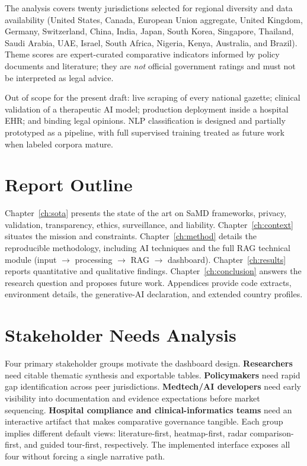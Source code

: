 The analysis covers twenty jurisdictions selected for regional diversity and data availability (United States, Canada, European Union aggregate, United Kingdom, Germany, Switzerland, China, India, Japan, South Korea, Singapore, Thailand, Saudi Arabia, UAE, Israel, South Africa, Nigeria, Kenya, Australia, and Brazil). Theme scores are expert-curated comparative indicators informed by policy documents and literature; they are \emph{not} official government ratings and must not be interpreted as legal advice.

Out of scope for the present draft: live scraping of every national gazette; clinical validation of a therapeutic AI model; production deployment inside a hospital EHR; and binding legal opinions. NLP classification is designed and partially prototyped as a pipeline, with full supervised training treated as future work when labeled corpora mature.

\section{Report Outline}
\label{sec:outline}

Chapter~\ref{ch:sota} presents the state of the art on SaMD frameworks, privacy, validation, transparency, ethics, surveillance, and liability. Chapter~\ref{ch:context} situates the mission and constraints. Chapter~\ref{ch:method} details the reproducible methodology, including AI techniques and the full RAG technical module (input $\rightarrow$ processing $\rightarrow$ RAG $\rightarrow$ dashboard). Chapter~\ref{ch:results} reports quantitative and qualitative findings. Chapter~\ref{ch:conclusion} answers the research question and proposes future work. Appendices provide code extracts, environment details, the generative-AI declaration, and extended country profiles.


\section{Stakeholder Needs Analysis}
\label{sec:stakeholders}

Four primary stakeholder groups motivate the dashboard design. \textbf{Researchers} need citable thematic synthesis and exportable tables. \textbf{Policymakers} need rapid gap identification across peer jurisdictions. \textbf{Medtech/AI developers} need early visibility into documentation and evidence expectations before market sequencing. \textbf{Hospital compliance and clinical-informatics teams} need an interactive artifact that makes comparative governance tangible. Each group implies different default views: literature-first, heatmap-first, radar comparison-first, and guided tour-first, respectively. The implemented interface exposes all four without forcing a single narrative path.

